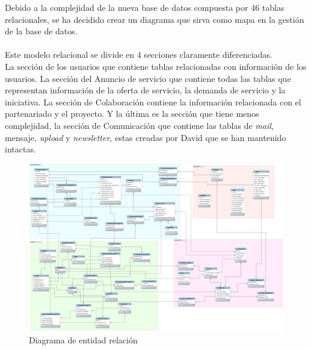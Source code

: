 \documentclass[11pt]{article}
\begin{document}
 Debido a la complejidad de la nueva base de datos compuesta por 46 tablas relacionales, se ha decidido crear un diagrama que sirva como mapa en la gestión de la base de datos.\\\\
Este modelo relacional se divide en 4 secciones claramente diferenciadas.\\
La sección de los usuarios que contiene tablas relacionadas con información de los usuarios. La sección del Anuncio de servicio que contiene todas las tablas que representan información de la oferta de servicio, la demanda de servicio y la iniciativa.
La sección de Colaboración contiene la información relacionada con el partenariado y el proyecto.
Y la última es la sección que tiene menos complejidad, la sección de Comunicación que contiene las tablas de \textit{mail}, mensaje, \textit{upload} y \textit{newsletter}, estas creadas por David que se han mantenido intactas.
\begin{figure}
	\centering
	\includegraphics[scale=0.15]{er}
	\caption{Diagrama de entidad relación}
\end{figure}
\end{document}
